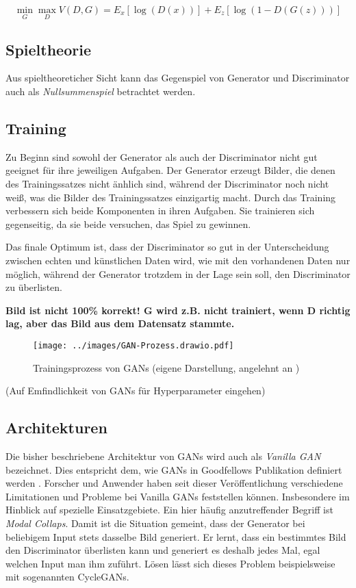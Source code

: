 \begin{equation}
	\min_{G} \max_{D} V(D,G) = E_x[\log(D(x))] + E_z[\log(1-D(G(z)))]
\end{equation}

\subsection{Spieltheorie}
Aus spieltheoreticher Sicht kann das Gegenspiel von Generator und Discriminator auch als \emph{Nullsummenspiel} betrachtet werden.

\subsection{Training}
Zu Beginn sind sowohl der Generator als auch der Discriminator nicht gut geeignet für ihre jeweiligen Aufgaben. Der Generator erzeugt Bilder, die denen des Trainingssatzes nicht änhlich sind, während der Discriminator noch nicht weiß, was die Bilder des Trainingssatzes einzigartig macht. Durch das Training verbessern sich beide Komponenten in ihren Aufgaben. Sie trainieren sich gegenseitig, da sie beide versuchen, das Spiel zu gewinnen.

Das finale Optimum ist, dass der Discriminator so gut in der Unterscheidung zwischen echten und künstlichen Daten wird, wie mit den vorhandenen Daten nur möglich, während der Generator trotzdem in der Lage sein soll, den Discriminator zu überlisten. \cite[S. 656]{visualApproach}

\textbf{Bild ist nicht 100\% korrekt! G wird z.B. nicht trainiert, wenn D richtig lag, aber das Bild aus dem Datensatz stammte.}
\begin{figure}[H]
	\centering
	\texttt{[image: ../images/GAN-Prozess.drawio.pdf]}
	\caption{Trainingsprozess von GANs (eigene Darstellung, angelehnt an \cite[S. 654f.]{visualApproach})}
	\label{fig:gan-trainingsprozess}
\end{figure}

(Auf Emfindlichkeit von GANs für Hyperparameter eingehen)

\subsection{Architekturen}
Die bisher beschriebene Architektur von \acp{GAN} wird auch als \emph{Vanilla \ac{GAN}} bezeichnet. Dies entspricht dem, wie \acp{GAN} in Goodfellows Publikation definiert werden \cite{Goodfellow-et-al-2016}. Forscher und Anwender haben seit dieser Veröffentlichung verschiedene Limitationen und Probleme bei Vanilla \acp{GAN} feststellen können. Insbesondere im Hinblick auf spezielle Einsatzgebiete. Ein hier häufig anzutreffender Begriff ist \emph{Modal Collaps}. Damit ist die Situation gemeint, dass der Generator bei beliebigem Input stets dasselbe Bild generiert. Er lernt, dass ein bestimmtes Bild den Discriminator überlisten kann und generiert es deshalb jedes Mal, egal welchen Input man ihm zuführt. Lösen lässt sich dieses Problem beispielsweise mit sogenannten \acp{CycleGAN}.

